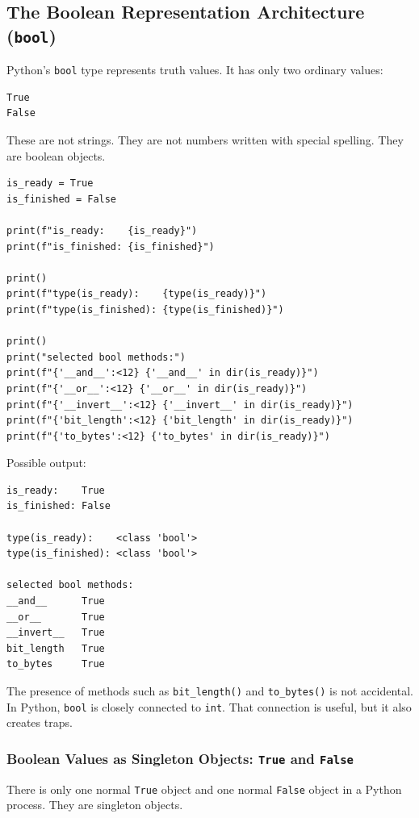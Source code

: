 \subsection{The Boolean Representation Architecture (\texttt{bool})}

Python's \texttt{bool} type represents truth values. It has only two ordinary values:

\begin{verbatim}
True
False
\end{verbatim}

These are not strings. They are not numbers written with special spelling. They are boolean objects.

\begin{verbatim}
is_ready = True
is_finished = False

print(f"is_ready:    {is_ready}")
print(f"is_finished: {is_finished}")

print()
print(f"type(is_ready):    {type(is_ready)}")
print(f"type(is_finished): {type(is_finished)}")

print()
print("selected bool methods:")
print(f"{'__and__':<12} {'__and__' in dir(is_ready)}")
print(f"{'__or__':<12} {'__or__' in dir(is_ready)}")
print(f"{'__invert__':<12} {'__invert__' in dir(is_ready)}")
print(f"{'bit_length':<12} {'bit_length' in dir(is_ready)}")
print(f"{'to_bytes':<12} {'to_bytes' in dir(is_ready)}")
\end{verbatim}

Possible output:

\begin{verbatim}
is_ready:    True
is_finished: False

type(is_ready):    <class 'bool'>
type(is_finished): <class 'bool'>

selected bool methods:
__and__      True
__or__       True
__invert__   True
bit_length   True
to_bytes     True
\end{verbatim}

The presence of methods such as \texttt{bit\_length()} and \texttt{to\_bytes()} is not accidental. In Python, \texttt{bool} is closely connected to \texttt{int}. That connection is useful, but it also creates traps.

\subsubsection{Boolean Values as Singleton Objects: \texttt{True} and \texttt{False}}

There is only one normal \texttt{True} object and one normal \texttt{False} object in a Python process. They are singleton objects.

